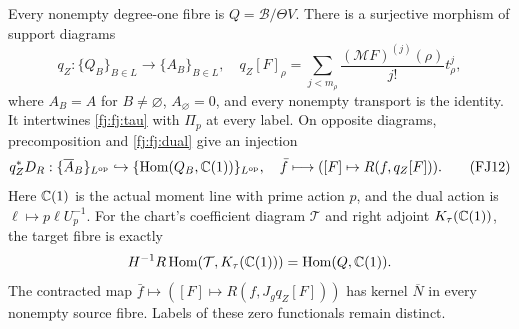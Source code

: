 \begin{theorem}
\label{fj:thm:tau}
Every nonempty degree-one fibre is $Q=\mathscr B/\Theta V$.
There is a surjective morphism of support diagrams
\[
 q_Z:\{Q_B\}_{B\in L}\longrightarrow\{A_B\}_{B\in L},\quad
 q_Z[F]_\rho=\sum_{j<m_\rho}
       \frac{(\mathcal MF)^{(j)}(\rho)}{j!}t_\rho^j,
 \tag{FJ11}\label{fj:fj:jet}
\]
where $A_B=A$ for $B\ne\varnothing$, $A_\varnothing=0$,
and every nonempty transport is the identity.
It intertwines \eqref{fj:fj:tau} with $\Pi_p$ at every label.
On opposite diagrams, precomposition and \eqref{fj:fj:dual} give an injection
\[
 q_Z^*D_R:\{\overline A_B\}_{L^{\rm op}}\hookrightarrow
        \{\operatorname{Hom}(Q_B,\mathbb C(1))\}_{L^{\rm op}},\quad
 \bar f\longmapsto([F]\mapsto R(f,q_Z[F])).
 \tag{FJ12}\label{fj:fj:dual-tau}
\]
Here $\mathbb C(1)$ is the actual moment line with prime action $p$, and
the dual action is $\ell\mapsto p\ell U_p^{-1}$.
For the chart's coefficient diagram $\mathcal T$ and right adjoint
$K_\tau(\mathbb C(1))$, the target fibre is exactly
\[
 H^{-1}R\operatorname{Hom}(\mathcal T,K_\tau(\mathbb C(1)))=\operatorname{Hom}(Q,\mathbb C(1)).
\]
The contracted map $\bar f\mapsto([F]\mapsto R(f,J_gq_Z[F]))$
has kernel $\overline N$ in every nonempty source fibre. Labels of
these zero functionals remain distinct.
\end{theorem}
